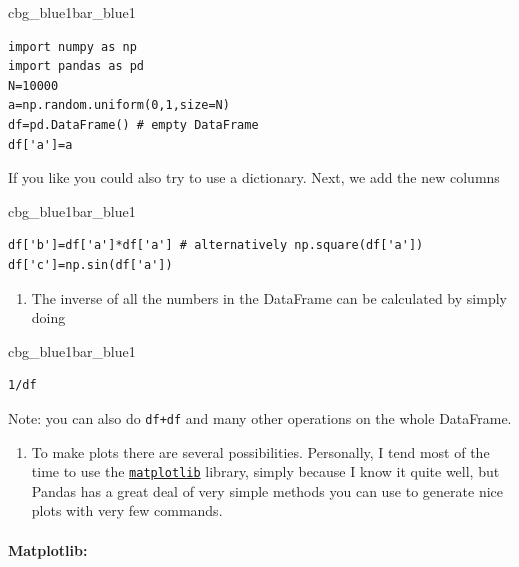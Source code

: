 \documentclass[%
oneside,                 %
final,                   %
10pt]{article}
\newenvironment{_pro_tight}[2]{
   \def\FrameCommand{\color{#2}\vrule width 1mm\normalcolor\colorbox{#1}}
   \FrameRule0.6pt\MakeFramed {\advance\hsize-2mm\FrameRestore}\vskip3mm}
   {\vskip0mm\endMakeFramed}
\newenvironment{pro}[2]{
\bgroup\rmfamily
\fboxsep=0mm\relax
\begin{_pro_tight}{#1}{#2}
\list{}{\parsep=-2mm\parskip=0mm\topsep=0pt\leftmargin=2mm
\rightmargin=2\leftmargin\leftmargin=4pt\relax}
\item\relax}
{\endlist\end{_pro_tight}\egroup}
\begin{document}
\begin{pro}{cbg_blue1}{bar_blue1}\begin{Verbatim}[numbers=none,fontsize=\fontsize{9pt}{9pt},baselinestretch=0.95,xleftmargin=2mm]
import numpy as np
import pandas as pd
N=10000
a=np.random.uniform(0,1,size=N)
df=pd.DataFrame() # empty DataFrame
df['a']=a

\end{Verbatim}
\end{pro}
\noindent

If you like you could also try to use a dictionary. Next, we add the new columns



\begin{pro}{cbg_blue1}{bar_blue1}\begin{Verbatim}[numbers=none,fontsize=\fontsize{9pt}{9pt},baselinestretch=0.95,xleftmargin=2mm]
df['b']=df['a']*df['a'] # alternatively np.square(df['a'])
df['c']=np.sin(df['a'])

\end{Verbatim}
\end{pro}
\noindent


\begin{enumerate}
\item The inverse of all the numbers in the DataFrame can be calculated by simply doing
\end{enumerate}

\noindent


\begin{pro}{cbg_blue1}{bar_blue1}\begin{Verbatim}[numbers=none,fontsize=\fontsize{9pt}{9pt},baselinestretch=0.95,xleftmargin=2mm]
1/df

\end{Verbatim}
\end{pro}
\noindent

Note: you can also do \texttt{df+df} and many other operations on the whole DataFrame.

\begin{enumerate}
\item To make plots there are several possibilities. Personally, I tend most of the time to use the  \href{{https://matplotlib.org/}}{\nolinkurl{matplotlib}} library, simply because I know it quite well, but Pandas has a great deal of very simple methods you can use to generate nice plots with very few commands.
\end{enumerate}

\noindent
\paragraph{Matplotlib:}
\end{document}
